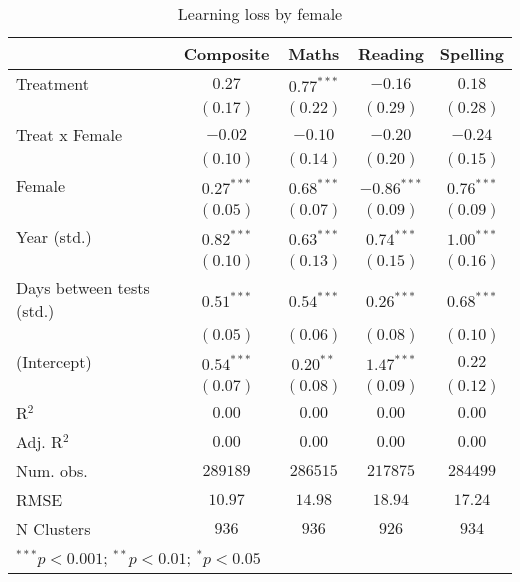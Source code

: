 
\begin{table}
\begin{center}
\begin{tabular}{l c c c c}
\hline
 & Composite & Maths & Reading & Spelling \\
\hline
Treatment                 & $0.27$       & $0.77^{***}$ & $-0.16$       & $0.18$       \\
                          & $(0.17)$     & $(0.22)$     & $(0.29)$      & $(0.28)$     \\
Treat x Female            & $-0.02$      & $-0.10$      & $-0.20$       & $-0.24$      \\
                          & $(0.10)$     & $(0.14)$     & $(0.20)$      & $(0.15)$     \\
Female                    & $0.27^{***}$ & $0.68^{***}$ & $-0.86^{***}$ & $0.76^{***}$ \\
                          & $(0.05)$     & $(0.07)$     & $(0.09)$      & $(0.09)$     \\
Year (std.)               & $0.82^{***}$ & $0.63^{***}$ & $0.74^{***}$  & $1.00^{***}$ \\
                          & $(0.10)$     & $(0.13)$     & $(0.15)$      & $(0.16)$     \\
Days between tests (std.) & $0.51^{***}$ & $0.54^{***}$ & $0.26^{***}$  & $0.68^{***}$ \\
                          & $(0.05)$     & $(0.06)$     & $(0.08)$      & $(0.10)$     \\
(Intercept)               & $0.54^{***}$ & $0.20^{**}$  & $1.47^{***}$  & $0.22$       \\
                          & $(0.07)$     & $(0.08)$     & $(0.09)$      & $(0.12)$     \\
\hline
R$^2$                     & $0.00$       & $0.00$       & $0.00$        & $0.00$       \\
Adj. R$^2$                & $0.00$       & $0.00$       & $0.00$        & $0.00$       \\
Num. obs.                 & $289189$     & $286515$     & $217875$      & $284499$     \\
RMSE                      & $10.97$      & $14.98$      & $18.94$       & $17.24$      \\
N Clusters                & $936$        & $936$        & $926$         & $934$        \\
\hline
\multicolumn{5}{l}{\scriptsize{$^{***}p<0.001$; $^{**}p<0.01$; $^{*}p<0.05$}}
\end{tabular}
\caption{Learning loss by female}
\label{tablefemale}
\end{center}
\end{table}
